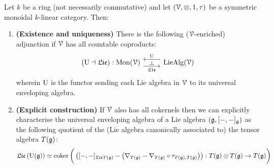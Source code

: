             \begin{theorem} \label{theorem: universal_enveloping_algebras_universal_property}
                 Let $k$ be a ring (not necessarily commutative) and let $(\calV, \tensor, 1, \tau)$ be a symmetric monoidal $k$-linear category. Then:
                    \begin{enumerate}
                        \item \textbf{(Existence and uniqueness)} There is the following ($\mathcal{V}$-enriched) adjunction if $\mathcal{V}$ has all countable coproducts:
                            $$
                                \begin{tikzcd}
                                	{(\U \ladjoint \frakLie): \Mon(\calV)} & {\Lie\Alg(\calV)}
                                	\arrow["{\frakLie}"{name=0, swap}, from=1-1, to=1-2, shift right=2]
                                	\arrow["{\U}"{name=1, swap}, from=1-2, to=1-1, shift right=2]
                                	\arrow["\dashv"{rotate=-90}, from=1, to=0, phantom]
                                \end{tikzcd}
                            $$
                        wherein $\mathrm{U}$ is the functor sending each Lie algebra in $\mathcal{V}$ to its universal enveloping algebra.
                        \item \textbf{(Explicit construction)} If $\mathcal{V}$ also has all cokernels then we can explicitly characterise the universal enveloping algebra of a Lie algebra $\left(\mathfrak{g}, [-,-]_{\mathfrak{g}}\right)$ as the following quotient of the (Lie algebra canonically associated to) the tensor algebra $T(\mathfrak{g})$:
                            $$\frakLie\left(\U(\g)\right) \cong \coker \bigg(\left([-,-]_{\frakLie T(\g)} - \left(\nabla_{T(\g)} - \nabla_{T(\g)} \circ \tau_{T(\g), T(\g)}\right)\right): T(\g) \tensor T(\g) \to T(\g)\bigg)$$
                    \end{enumerate}
            \end{theorem}
